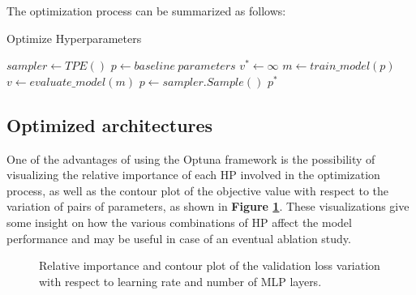 \noindent
The optimization process can be summarized as follows:
\begin{algorithm}[ht!]
\caption{Optimize Hyperparameters}\label{alg:opt}
    $sampler \leftarrow TPE()$\;
    $p \leftarrow baseline\ parameters$\;
    $v^* \leftarrow \infty$\;
    {
        $m \leftarrow train\_model(p)$ 
        $v \leftarrow evaluate\_model(m)$
        $p \leftarrow sampler.Sample()$\;
    }
    \Return $p^*$
\end{algorithm}


\subsection{Optimized architectures} %

\noindent
One of the advantages of using the Optuna framework is the possibility of visualizing the relative importance of each HP involved in the optimization process, as well as the contour plot of the objective value with respect to the variation of pairs of parameters, as shown in \textbf{Figure \ref{fig:HP_visualizations}}. These visualizations give some insight on how the various combinations of HP affect the model performance and may be useful in case of an eventual ablation study.

\begin{figure}[ht!]
    \centering
        \hfill
    \caption{Relative importance and contour plot of the validation loss variation with respect to learning rate and  number of MLP layers.}\label{fig:HP_visualizations}
\end{figure}

